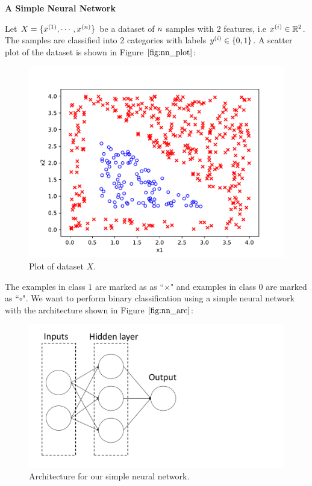 \item {} {\bf A Simple Neural Network}

Let $X = \{x^{(1)}, \cdots, x^{({n})}\}$ be a dataset of ${n}$ samples with 2 features, i.e $x^{(i)} \in \mathbb{R}^2$. The samples are classified into 2 categories with labels $y^{(i)} \in \{0, 1\}$. A scatter plot of the dataset is shown in Figure $\ref{fig:nn_plot}$:
\begin{figure}[htbp]
    \centering
    \includegraphics[scale=0.5]{simple_nn/nn_plot.pdf}
    \caption{Plot of dataset $X$.}
    \label{fig:nn_plot}
\end{figure}

The examples in class $1$ are marked as as ``$\times$" and examples in class $0$ are marked as ``$\circ$". We want to perform binary classification using a simple neural network with the architecture shown in Figure $\ref{fig:nn_arc}$:
\begin{figure}[htbp]
    \centering
    \includegraphics[scale=0.2, trim = 0 0 360 0, clip]{simple_nn/nn_architecture.pdf}
    \caption{Architecture for our simple neural network.}
     \label{fig:nn_arc}
\end{figure}


